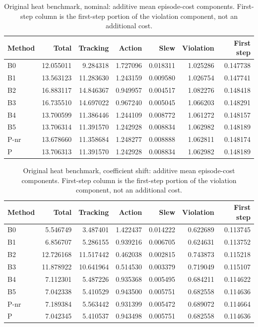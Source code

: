 \begin{table}[ht]
\caption{Original heat benchmark, nominal: additive mean episode-cost components. First-step column is the first-step portion of the violation component, not an additional cost.}\label{tab:costparts_locked_nominal}
\centering\small
\begin{tabular}{@{}lrrrrrr@{}}\toprule
Method & Total & Tracking & Action & Slew & Violation & First step\\\midrule
B0 & 12.055011 & 9.284318 & 1.727096 & 0.018311 & 1.025286 & 0.147738 \\
B1 & 13.563123 & 11.283630 & 1.243159 & 0.009580 & 1.026754 & 0.147741 \\
B2 & 16.883117 & 14.846367 & 0.949957 & 0.004517 & 1.082276 & 0.148418 \\
B3 & 16.735510 & 14.697022 & 0.967240 & 0.005045 & 1.066203 & 0.148291 \\
B4 & 13.700599 & 11.386446 & 1.244109 & 0.008772 & 1.061272 & 0.148157 \\
B5 & 13.706314 & 11.391570 & 1.242928 & 0.008834 & 1.062982 & 0.148189 \\
P-nr & 13.678660 & 11.358684 & 1.248277 & 0.008888 & 1.062811 & 0.148174 \\
P & 13.706313 & 11.391570 & 1.242928 & 0.008834 & 1.062982 & 0.148189 \\
\bottomrule\end{tabular}
\end{table}
\begin{table}[ht]
\caption{Original heat benchmark, coefficient shift: additive mean episode-cost components. First-step column is the first-step portion of the violation component, not an additional cost.}\label{tab:costparts_locked_coefficient_ood}
\centering\small
\begin{tabular}{@{}lrrrrrr@{}}\toprule
Method & Total & Tracking & Action & Slew & Violation & First step\\\midrule
B0 & 5.546749 & 3.487401 & 1.422437 & 0.014222 & 0.622689 & 0.113745 \\
B1 & 6.856707 & 5.286155 & 0.939216 & 0.006705 & 0.624631 & 0.113752 \\
B2 & 12.726168 & 11.517442 & 0.462038 & 0.002815 & 0.743873 & 0.115218 \\
B3 & 11.878922 & 10.641964 & 0.514530 & 0.003379 & 0.719049 & 0.115107 \\
B4 & 7.112301 & 5.487226 & 0.935368 & 0.005495 & 0.684211 & 0.114622 \\
B5 & 7.042338 & 5.410529 & 0.943500 & 0.005751 & 0.682558 & 0.114636 \\
P-nr & 7.189384 & 5.563442 & 0.931399 & 0.005472 & 0.689072 & 0.114664 \\
P & 7.042345 & 5.410537 & 0.943498 & 0.005751 & 0.682558 & 0.114636 \\
\bottomrule\end{tabular}
\end{table}
